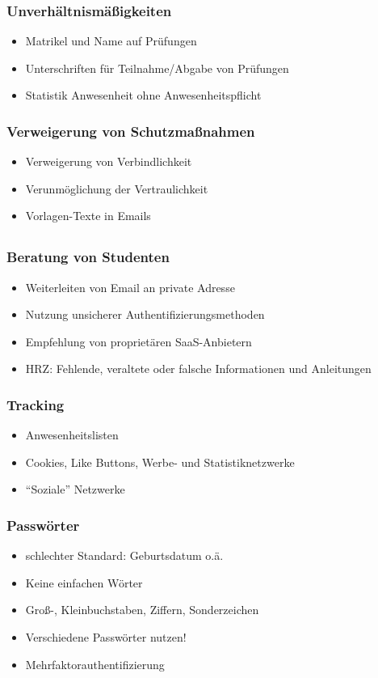 \documentclass[12pt]{beamer}
\begin{document}
\begin{frame}
	\frametitle{Unverhältnismäßigkeiten}
	\begin{itemize}
		\item Matrikel und Name auf Prüfungen
		\item Unterschriften für Teilnahme/Abgabe von Prüfungen
		\item Statistik Anwesenheit ohne Anwesenheitspflicht
	\end{itemize}
\end{frame}

\begin{frame}
	\frametitle{Verweigerung von Schutzmaßnahmen}
	\begin{itemize}
		\item Verweigerung von Verbindlichkeit
		\item Verunmöglichung der Vertraulichkeit
		\item Vorlagen-Texte in Emails
	\end{itemize}
\end{frame}

\subsection{}

\begin{frame}
	\frametitle{Beratung von Studenten}
	\begin{itemize}
		\item Weiterleiten von Email an private Adresse
		\item Nutzung unsicherer Authentifizierungsmethoden
		\item Empfehlung von proprietären SaaS-Anbietern
		\item HRZ: Fehlende, veraltete oder falsche Informationen und Anleitungen
	\end{itemize}
\end{frame}

\begin{frame}
	\frametitle{Tracking}
	\begin{itemize}
		\item Anwesenheitslisten
		\item Cookies, Like Buttons, Werbe- und Statistiknetzwerke
		\item "`Soziale"' Netzwerke
	\end{itemize}
\end{frame}

\begin{frame}
	\frametitle{Passwörter}
	\begin{itemize}
		\item schlechter Standard: Geburtsdatum o.ä.
		\item Keine einfachen Wörter
		\item Groß-, Kleinbuchstaben, Ziffern, Sonderzeichen
		\item Verschiedene Passwörter nutzen!
		\item Mehrfaktorauthentifizierung 
	\end{itemize}
\end{frame}
\end{document}
